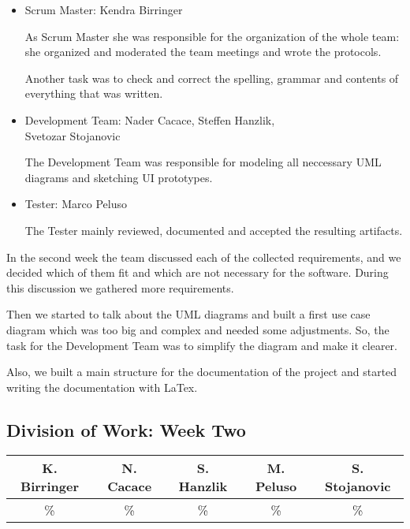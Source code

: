 \documentclass[a4paper, 12pt]{article}
\begin{document}
\begin{itemize}
\item Scrum Master: Kendra Birringer

As Scrum Master she was responsible for the organization of the whole team: she organized and moderated the team meetings and wrote the protocols. 

Another task was to check and correct the spelling, grammar and contents of everything that was written.

\item Development Team: Nader Cacace, Steffen Hanzlik,\\
      Svetozar Stojanovic

The Development Team was responsible for modeling all neccessary UML diagrams and sketching UI prototypes.

\item Tester: Marco Peluso

The Tester mainly reviewed, documented and accepted the resulting artifacts.
\end{itemize}


In the second week the team discussed each of the collected requirements, and we decided which of them fit and which are not necessary for the software. During this discussion we gathered more requirements.

Then we started to talk about the UML diagrams and built a first use case diagram which was too big and complex and needed some adjustments. So, the task for the Development Team was to simplify the diagram and make it clearer.

Also, we built a main structure for the documentation of the project and started writing the documentation with LaTex. 

\newpage
\subsection{Division of Work: Week Two}

\begin{table}[h]
\centering
\setlength{\tabcolsep}{10pt}
\begin{tabular}{|c|c|c|c|c|}
\hline
K. Birringer & N. Cacace & S. Hanzlik & M. Peluso & S. Stojanovic\\
\hline
\% & \% & \% & \% & \% \\ 
\hline
\end{tabular}
\end{table}

\end{document}
